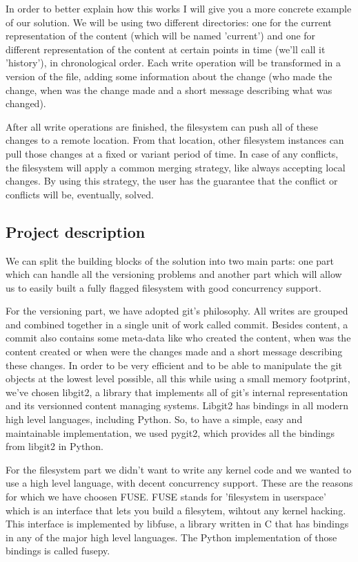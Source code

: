 In order to better explain how this works I will give you a more concrete example of our solution. We will be using two different directories: one for the current representation of the content (which will be named 'current') and one for different representation of the content at certain points in time (we'll call it 'history'), in chronological order. Each write operation will be transformed in a version of the file, adding some information about the change (who made the change, when was the change made and a short message describing what was changed).

After all write operations are finished, the filesystem can push all of these changes to a remote location. From that location, other filesystem instances can pull those changes at a fixed or variant period of time. In case of any conflicts, the filesystem will apply a common merging strategy, like always accepting local changes. By using this strategy, the user has the guarantee that the conflict or conflicts will be, eventually, solved.

\subsection{Project description}
We can split the building blocks of the solution into two main parts: one part which can handle all the versioning problems and another part which will allow us to easily built a fully flagged filesystem with good concurrency support.

For the versioning part, we have adopted git's philosophy. All writes are grouped and combined together in a single unit of work called commit. Besides content, a commit also contains some meta-data like who created the content, when was the content created or when were the changes made and a short message describing these changes. In order to be very efficient and to be able to manipulate the git objects at the lowest level possible, all this while using a small memory footprint, we've chosen libgit2, a library that implements all of git's internal representation and its versionned content managing systems. Libgit2 has bindings in all modern high level languages, including Python. So, to have a simple, easy and maintainable implementation, we used pygit2, which provides all the bindings from libgit2 in Python.

For the filesystem part we didn't want to write any kernel code and we wanted to use a high level language, with decent concurrency support. These are the reasons for which we have choosen FUSE. FUSE stands for 'filesystem in userspace' which is an interface that lets you build a filesytem, wihtout any kernel hacking. This interface is implemented by libfuse, a library written in C that has bindings in any of the major high level languages. The Python implementation of those bindings is called fusepy.

